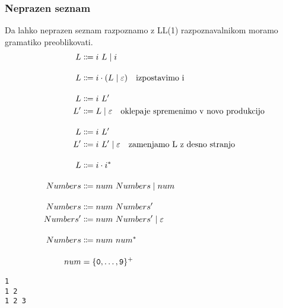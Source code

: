 \documentclass{report}
\newcommand{\Null}{\varepsilon}
\newcommand{\Char}[1]{\texttt{#1}}
\newcommand{\Seq}{\cdot}
\newcommand{\Spc}{\ }
\newcommand{\Union}{\mathrel{|}}
\newcommand{\Kleene}[1]{{#1}^\ast}
\newcommand{\KleenePlus}[1]{#1^+}
\newcommand{\Arrow}{\Coloneq}
\newcommand{\NT}[1]{{#1}}
\newcommand{\T}[1]{{#1}}
\begin{document}
\subsubsection{Neprazen seznam}
Da lahko neprazen seznam razpoznamo z LL(1) razpoznavalnikom moramo gramatiko preoblikovati.
\begin{equation*}
  \begin{aligned}[t]
    \NT{L} &\Arrow \T{i} \Spc \NT{L} \Union \T{i}\\[1em]
    \NT{L} &\Arrow \T{i} \Seq (\NT{L} \Union \Null)\text{\quad izpostavimo \T{i}}\\[1em]
    \NT{L} &\Arrow \T{i} \Spc \NT{L'}\\
    \NT{L'} &\Arrow \NT{L} \Union \Null \text{\quad oklepaje spremenimo v novo produkcijo}\\[1em]
    \NT{L} &\Arrow \T{i} \Spc \NT{L'}\\
    \NT{L'} &\Arrow \T{i} \Spc \NT{L'} \Union \Null \text{\quad zamenjamo \NT{L} z desno stranjo}\\[1em]
    \NT{L} &\Arrow \T{i} \Seq \Kleene{\T{i}}\\[1em]
    \NT{Numbers} &\Arrow \T{num} \Spc \NT{Numbers} \Union \T{num}\\[1em]
    \NT{Numbers} &\Arrow \T{num} \Spc \NT{Numbers'}\\
    \NT{Numbers'} &\Arrow \T{num} \Spc \NT{Numbers'} \Union \Null\\[1em]
    \NT{Numbers} &\Arrow \T{num} \Spc \Kleene{\T{num}}\\[1em]
    \T{num} &= \KleenePlus{\{\Char{0}, \dots, \Char{9}\}}
  \end{aligned}
\end{equation*}
\begin{lstlisting}
1
1 2
1 2 3
\end{lstlisting}
\end{document}
